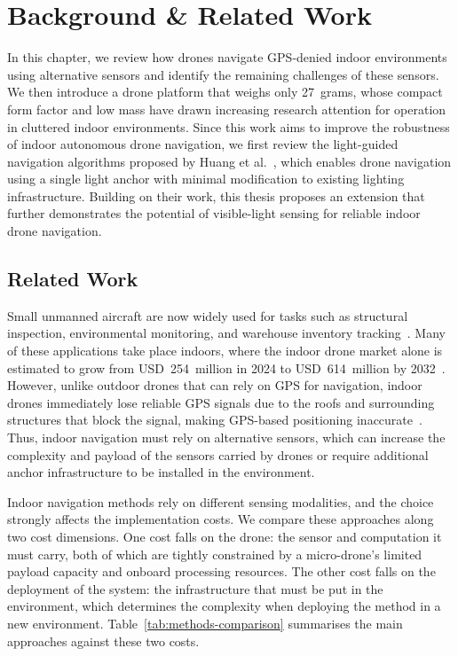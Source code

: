 \chapter{Background \& Related Work}
\label{chp:background}

In this chapter, we review how drones navigate GPS-denied indoor environments using alternative sensors and identify the remaining challenges of these sensors. We then introduce a drone platform that weighs only 27~grams, whose compact form factor and low mass have drawn increasing research attention for operation in cluttered indoor environments. Since this work aims to improve the robustness of indoor autonomous drone navigation, we first review the light-guided navigation algorithms proposed by Huang et al.~\cite{huang2026lta}, which enables drone navigation using a single light anchor with minimal modification to existing lighting infrastructure. Building on their work, this thesis proposes an extension that further demonstrates the potential of visible-light sensing for reliable indoor drone navigation.

\section{Related Work}
\label{sec:related-work}

Small unmanned aircraft are now widely used for tasks such as structural inspection, environmental monitoring, and warehouse inventory tracking~\cite{floreano2015drones}. Many of these applications take place indoors, where the indoor drone market alone is estimated to grow from USD~254~million in 2024 to USD~614~million by 2032~\cite{intelmarket2026}. However, unlike outdoor drones that can rely on GPS for navigation, indoor drones immediately lose reliable GPS signals due to the roofs and surrounding structures that block the signal, making GPS-based positioning inaccurate~\cite{zafari2019indoor}. Thus, indoor navigation must rely on alternative sensors, which can increase the complexity and payload of the sensors carried by drones or require additional anchor infrastructure to be installed in the environment.

Indoor navigation methods rely on different sensing modalities, and the choice strongly affects the implementation costs. We compare these approaches along two cost dimensions. One cost falls on the drone: the sensor and computation it must carry, both of which are tightly constrained by a micro-drone's limited payload capacity and onboard processing resources. The other cost falls on the deployment of the system: the infrastructure that must be put in the environment, which determines the complexity when deploying the method in a new environment. Table~\ref{tab:methods-comparison} summarises the main approaches against these two costs.

